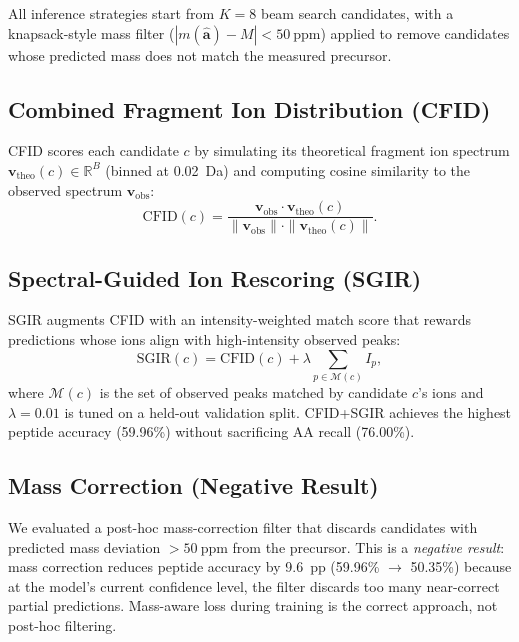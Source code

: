 \documentclass[10pt,twocolumn]{article}
\newcommand{\vect}[1]{\mathbf{#1}}
\newcommand{\R}{\mathbb{R}}
\begin{document}
All inference strategies start from $K\!=\!8$ beam search candidates, with a knapsack-style
mass filter ($|m(\hat{\vect{a}}) - M| < 50~\text{ppm}$) applied to remove candidates whose
predicted mass does not match the measured precursor.

\subsection{Combined Fragment Ion Distribution (CFID)}

CFID scores each candidate $c$ by simulating its theoretical fragment ion spectrum
$\vect{v}_{\text{theo}}(c) \in \R^B$ (binned at 0.02~Da) and computing cosine similarity to
the observed spectrum $\vect{v}_{\text{obs}}$:
\begin{equation}
  \text{CFID}(c) = \frac{\vect{v}_{\text{obs}} \cdot \vect{v}_{\text{theo}}(c)}
                        {\|\vect{v}_{\text{obs}}\| \cdot \|\vect{v}_{\text{theo}}(c)\|}.
  \label{eq:cfid}
\end{equation}

\subsection{Spectral-Guided Ion Rescoring (SGIR)}

SGIR augments CFID with an intensity-weighted match score that rewards predictions whose ions
align with high-intensity observed peaks:
\begin{equation}
  \text{SGIR}(c) = \text{CFID}(c) + \lambda \sum_{p \in \mathcal{M}(c)} I_p,
  \label{eq:sgir}
\end{equation}
where $\mathcal{M}(c)$ is the set of observed peaks matched by candidate $c$'s ions and
$\lambda\!=\!0.01$ is tuned on a held-out validation split.
CFID+SGIR achieves the highest peptide accuracy (59.96\%) without sacrificing AA recall (76.00\%).

\subsection{Mass Correction (Negative Result)}

We evaluated a post-hoc mass-correction filter that discards candidates with predicted mass
deviation $> 50~\text{ppm}$ from the precursor.
This is a \emph{negative result}: mass correction reduces peptide accuracy by 9.6~pp
(59.96\% $\to$ 50.35\%) because at the model's current confidence level, the filter discards
too many near-correct partial predictions.
Mass-aware loss during training is the correct approach, not post-hoc filtering.
\end{document}
